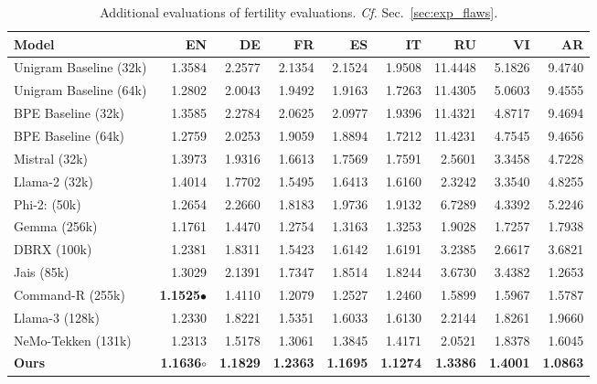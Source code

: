 \documentclass[11pt]{article}
\begin{document}
\begin{table}[]
\small
    \centering
    \begin{tabular}{l | r r r r r r r r}
     \textbf{Model}    &  \textbf{EN} & \textbf{DE} & \textbf{FR} & \textbf{ES} & \textbf{IT} & \textbf{RU} &\textbf{VI} &\textbf{AR} \\
     \hline
      
      Unigram Baseline (32k) & 1.3584 & 2.2577  & 2.1354 & 2.1524 & 1.9508  & 11.4448 & 5.1826 & 9.4740\\
      Unigram Baseline (64k) & 1.2802 & 2.0043 & 1.9492 & 1.9163  & 1.7263 & 11.4305& 5.0603 & 9.4555\\
      BPE Baseline (32k) & 1.3585 & 2.2784  & 2.0625 & 2.0977 & 1.9396 & 11.4321 & 4.8717 & 9.4694\\
      BPE Baseline (64k) & 1.2759 & 2.0253 & 1.9059 & 1.8894 & 1.7212 & 11.4231 & 4.7545 & 9.4656\\
      Mistral (32k) &  1.3973 & 1.9316 & 1.6613 & 1.7569 & 1.7591 &  2.5601 & 3.3458 & 4.7228\\
      Llama-2 (32k) & 1.4014 & 1.7702 & 1.5495 & 1.6413 & 1.6160 & 2.3242 & 3.3540 & 4.8255\\
      Phi-2: (50k) & 1.2654  & 2.2660 & 1.8183 & 1.9736 & 1.9132 & 6.7289 & 4.3392 & 5.2246\\
      Gemma (256k) & 1.1761 & 1.4470 & 1.2754 & 1.3163 & 1.3253 & 1.9028 & 1.7257 & 1.7938\\
      DBRX (100k) & 1.2381 & 1.8311 & 1.5423 & 1.6142 & 1.6191 & 3.2385 & 2.6617 & 3.6821\\
      Jais (85k) & 1.3029 & 2.1391 & 1.7347 & 1.8514 &  1.8244 & 3.6730 & 3.4382 & 1.2653 \\
      Command-R (255k) & \textbf{1.1525$\bullet$} & 1.4110 & 1.2079 & 1.2527 & 1.2460 & 1.5899 & 1.5967 & 1.5787\\
      Llama-3 (128k) & 1.2330 & 1.8221 & 1.5351 & 1.6033 & 1.6130 & 2.2144 & 1.8261 & 1.9660\\
      NeMo-Tekken (131k) & 1.2313 & 1.5178 & 1.3061 & 1.3845 &  1.4171 & 2.0521 & 1.8378 & 1.6045 \\
      \textbf{Ours}   &  \textbf{1.1636$\circ$} & \textbf{1.1829} & \textbf{1.2363} & \textbf{1.1695} & \textbf{1.1274} & \textbf{1.3386} & \textbf{1.4001} & \textbf{1.0863}\\

    \end{tabular}
    \caption{Additional evaluations of fertility evaluations. \emph{Cf.} Sec.~\ref{sec:exp_flaws}.}
    \label{tab:language_fertility_complete}
\end{table}
\end{document}
